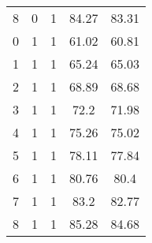 \begin{table}[!htbp]
\begin{tabular}{@{}lllcc@{}}
8 & 0 & 1 & 84.27           & 83.31           \\
0 & 1 & 1 & 61.02           & 60.81           \\
1 & 1 & 1 & 65.24           & 65.03           \\
2 & 1 & 1 & 68.89           & 68.68           \\
3 & 1 & 1 & 72.2            & 71.98           \\
4 & 1 & 1 & 75.26           & 75.02           \\
5 & 1 & 1 & 78.11           & 77.84           \\
6 & 1 & 1 & 80.76           & 80.4            \\
7 & 1 & 1 & 83.2            & 82.77           \\
8 & 1 & 1 & 85.28           & 84.68           \\ \bottomrule
\end{tabular}
\label{tab1}
\end{table}
